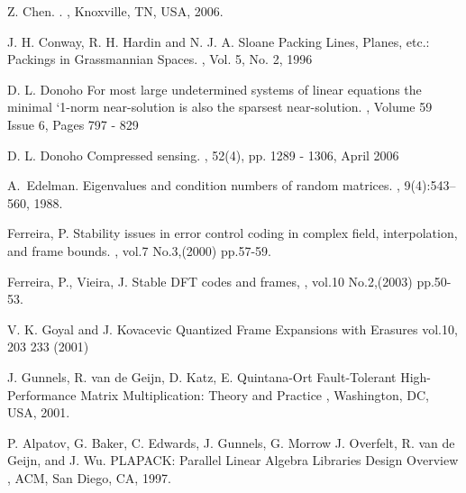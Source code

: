 \documentclass{sig-alternate}
\begin{document}
\begin{thebibliography}{14}
{Z. Chen}.
.
, {Knoxville, TN, USA}, {2006}.



J. H. Conway, R. H. Hardin and N. J. A. Sloane
\newblock Packing Lines, Planes, etc.: Packings in Grassmannian Spaces.
, Vol. 5, No. 2, 1996



D. L. Donoho
\newblock For most large undetermined systems of linear
equations the minimal `1-norm near-solution is also the
sparsest near-solution.
, 
Volume 59 Issue 6, Pages 797 - 829


D. L. Donoho
\newblock Compressed sensing.
, 
52(4), pp. 1289 - 1306, April 2006



A.~Edelman.
\newblock Eigenvalues and condition numbers of random matrices.
, 9(4):543--560, 1988.




Ferreira, P.
\newblock Stability issues in error control coding in
complex field, interpolation, and frame bounds.
, 
vol.7 No.3,(2000) pp.57-59.

Ferreira, P., Vieira, J.  
\newblock Stable DFT codes and frames,
, vol.10 No.2,(2003) pp.50-53.


V. K. Goyal and J. Kovacevic
\newblock Quantized Frame Expansions with Erasures
  vol.10, 203 233 (2001)


J. Gunnels, R. van de Geijn, D. Katz, E. Quintana-Ort 
\newblock Fault-Tolerant High-Performance Matrix Multiplication: Theory and Practice
, Washington, DC,  USA, 2001.


P. Alpatov, G. Baker, C. Edwards, J. Gunnels, G. Morrow
J. Overfelt, R. van de Geijn, and J. Wu.
\newblock PLAPACK: Parallel Linear Algebra Libraries Design Overview
, ACM, San Diego, CA, 1997.


\end{thebibliography}
\end{document}
